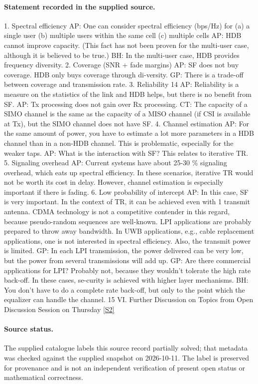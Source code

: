 \documentclass[11pt]{article}
\begin{document}
\paragraph{Statement recorded in the supplied source.}
1. Spectral efficiency AP: One can consider spectral efficiency (bps/Hz) for (a) a single user (b) multiple users within the same cell (c) multiple cells AP: HDB cannot improve capacity. (This fact has not been proven for the multi-user case, although it is believed to be true.) BH: In the multi-user case, HDB provides frequency diversity. 2. Coverage (SNR + fade margins) AP: SF does not buy coverage. HDB only buys coverage through di-versity. GP: There is a trade-off between coverage and transmission rate. 3. Reliability 14 AP: Reliability is a measure on the statistics of the link and HDB helps, but there is no benefit from SF. AP: Tx processing does not gain over Rx processing. CT: The capacity of a SIMO channel is the same as the capacity of a MISO channel (if CSI is available at Tx), but the SIMO channel does not have SF. 4. Channel estimation AP: For the same amount of power, you have to estimate a lot more parameters in a HDB channel than in a non-HDB channel. This is problematic, especially for the weaker taps. AP: What is the interaction with SF? This relates to iterative TR. 5. Signaling overhead AP: Current systems have about 25-30 \% signaling overhead, which eats up spectral efficiency. In these scenarios, iterative TR would not be worth its cost in delay. However, channel estimation is especially important if there is fading. 6. Low probability of intercept AP: In this case, SF is very important. In the context of TR, it can be achieved even with 1 transmit antenna. CDMA technology is not a competitive contender in this regard, because pseudo-random sequences are well-known. LPI applications are probably prepared to throw away bandwidth. In UWB applications, e.g., cable replacement applications, one is not interested in spectral efficiency. Also, the transmit power is limited. GP: In each LPI transmission, the power delivered can be very low, but the power from several transmissions will add up. GP: Are there commercial applications for LPI? Probably not, because they wouldn't tolerate the high rate back-off. In these cases, se-curity is achieved with higher layer mechanisms. BH: You don't have to do a complete rate back-off, but only to the point which the equalizer can handle the channel. 15 VI. Further Discussion on Topics from Open Discussion Session on Thursday \href{https://aimath.org/WWN/timerev/timerev.pdf}{[S2]}
\paragraph{Source status.}
The supplied catalogue labels this source record partially solved; that metadata was checked against the supplied snapshot on 2026-10-11. The label is preserved for provenance and is not an independent verification of present open status or mathematical correctness.
\end{document}
